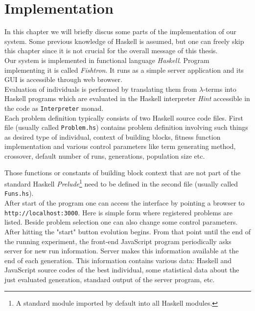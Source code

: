 \documentclass[12pt,a4paper]{report}
\newcommand{\lterms}{$\lambda$-terms\xspace}
\begin{document}
\chapter{ Implementation }	

In this chapter we will briefly discus some parts of the implementation
of our system. Some previous knowledge of Haskell is assumed, but one can
freely skip this chapter since it is not crucial for the 
overall message of this thesis. \\

Our system is implemented in functional language \textit{Haskell}.
Program implementing it is called \textit{Fishtron}.
It runs as a simple server application and its GUI is
accessible through web browser.\\



Evaluation of individuals is performed by translating them
from \lterms into Haskell programs which are evaluated
in the Haskell interpreter \textit{Hint} accessible 
in the code as \texttt{Interpreter} monad.  \\

Each problem definition typically consists of two Haskell 
source code files. First file (usually called \texttt{Problem.hs}) 
contains problem definition involving such things as desired 
type of individual, context of building blocks, 
fitness function implementation and various control parameters 
like term generating method, crossover,
default number of runs, generations, population size etc. 

Those functions or constants of building block context
that are not part of the standard Haskell \textit{Prelude}\footnote{
A standard module imported by default into all Haskell modules.}
need to be defined in the second file (usually called \texttt{Funs.hs}).\\

After start of the program one can access the interface
by pointing a browser to \texttt{http://localhost:3000}. Here is simple 
form where registered problems are listed. Beside problem selection
one can also change some control parameters. After hitting the "start"
button evolution begins. From that point until the end of the running
experiment, the front-end JavaScript program periodically asks
server for new run information. Server makes this information available 
at the end of each generation. This information contains various
data: Haskell and JavaScript source codes of the best individual,
some statistical data about the just evaluated generation,  
standard output of the server program, etc.
\end{document}
